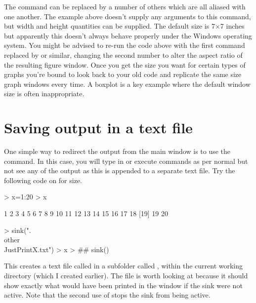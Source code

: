The  command can be replaced by a number of others which are all aliased with one another. The example above doesn't supply any arguments to this command, but width and height quantities can be supplied. The default size is 7$\times$7 inches but apparently this doesn't always behave properly under the Windows operating system. You might be advised to re-run the code above with the first command replaced by  or similar, changing the second number to alter the aspect ratio of the resulting figure window. Once you get the size you want for certain types of graphs you're bound to look back to your old code and replicate the same size graph windows every time. A boxplot is a key example where the default window size is often inappropriate. 
 
\section{Saving output in a text file}\label{TextSink} 
 
One simple way to redirect the output from the main \R{} window is to use the  command. In this case, you will type in or execute commands as per normal but not see any of the output as this is appended to a separate text file. Try the following code on for size. 
 

\begin{Schunk}
\begin{Sinput}
> x=1:20 
> x 
\end{Sinput}
\begin{Soutput}
 [1]  1  2  3  4  5  6  7  8  9 10 11 12 13 14 15 16 17 18
[19] 19 20
\end{Soutput}
\end{Schunk}

\begin{Schunk}
\begin{Sinput}
> sink(".\\other\\JustPrintX.txt")
> x
> ## sink()
\end{Sinput}
\end{Schunk}

 
This creates a text file called  in a subfolder called , within the current working directory (which I created earlier). The file is worth looking at because it should show exactly what would have been printed in the \R{} window if the sink were not active. Note that the second use of  stops the sink from being active. 
 

